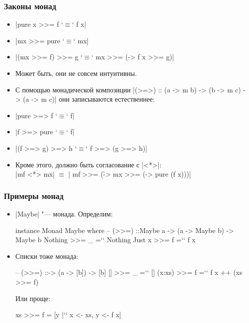 \documentclass[11pt]{beamer}
\begin{document}
\begin{frame}[fragile]
\frametitle{Законы монад}
\begin{itemize}
    \item \haskinline|pure x >>= f `$\equiv$` f x| 
    \item \haskinline|mx >>= pure `$\equiv$` mx| 
    \item \haskinline[fontsize=\small]|(mx >>= f) >>= g `$\equiv$` mx >>= (\x -> f x >>= g)| 
    \item Может быть, они не совсем интуитивны.
    \pause
    \item С помощью монадической композиции \haskinline|(>=>) :: (a -> m b) -> (b -> m c) -> (a -> m c)| они записываются естественнее: 
    \item \haskinline|pure >=> f `$\equiv$` f| 
    \item \haskinline|f >=> pure `$\equiv$` f| 
    \item \haskinline|(f >=> g) >=> h `$\equiv$` f >=> (g >=> h)| \pause
    \item Кроме этого, должно быть согласование с \haskinline|<*>|: \\
    \haskinline|mf <*> mx| $\equiv$ \haskinline|  mf >>= (\f -> mx >>= (\x -> pure (f x)))| 
\end{itemize}
\end{frame}

\begin{frame}[fragile]
\frametitle{Примеры монад}
\begin{itemize}[<+->]
    \item \haskinline|Maybe| "--- монада. Определим:
    \begin{haskell}
    instance Monad Maybe where
      -- (>{}>=) ::\pause Maybe a -> (a -> Maybe b) -> Maybe b
      Nothing >>= _ =`\pause` Nothing
      Just x  >>= f =`\pause` f x
    \end{haskell}
    \item Списки тоже монада:
    \begin{haskell}
    -- (>{}>=) ::\pause [a] -> (a -> [b]) -> [b]
    []     >>= _ =`\pause` []
    (x:xs) >>= f =`\pause` f x ++ (xs >>= f)
    \end{haskell}
    Или проще:
    \begin{haskell}
    xs >>= f = [y |`\pause` x <- xs, y <- f x]
    \end{haskell}
\end{itemize}
\end{frame}
\end{document}
